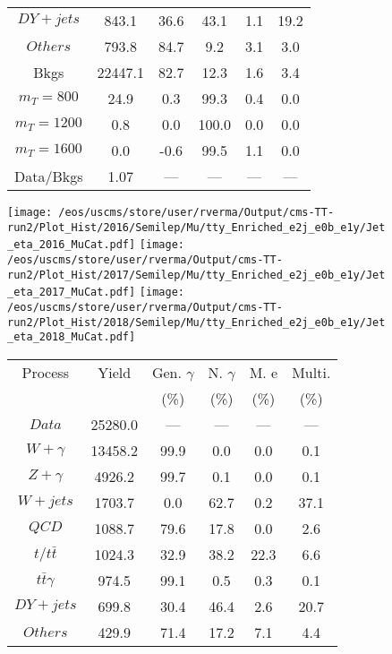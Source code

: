 \begin{figure}
\begin{minipage}[c]{0.32\textwidth}
{\begin{tabular}{cccccc}
$ DY+jets $ &  843.1 &  36.6 &  43.1 &  1.1 &  19.2\\
$ Others $ &  793.8 &  84.7 &  9.2 &  3.1 &  3.0\\
Bkgs &  22447.1 &  82.7 &  12.3 &  1.6 &  3.4\\
$ m_{T} = 800 $ &  24.9 &  0.3 &  99.3 &  0.4 &  0.0\\
$ m_{T} = 1200 $ &  0.8 &  0.0 &  100.0 &  0.0 &  0.0\\
$ m_{T} = 1600 $ &  0.0 &  -0.6 &  99.5 &  1.1 &  0.0\\
Data/Bkgs &  1.07 &  --- &  --- &  --- &  ---\\
\hline
\end{tabular}
}
\end{minipage}
\end{figure}

\begin{figure}
\centering
\texttt{[image: /eos/uscms/store/user/rverma/Output/cms-TT-run2/Plot\_Hist/2016/Semilep/Mu/tty\_Enriched\_e2j\_e0b\_e1y/Jet\_eta\_2016\_MuCat.pdf]}
\texttt{[image: /eos/uscms/store/user/rverma/Output/cms-TT-run2/Plot\_Hist/2017/Semilep/Mu/tty\_Enriched\_e2j\_e0b\_e1y/Jet\_eta\_2017\_MuCat.pdf]}
\texttt{[image: /eos/uscms/store/user/rverma/Output/cms-TT-run2/Plot\_Hist/2018/Semilep/Mu/tty\_Enriched\_e2j\_e0b\_e1y/Jet\_eta\_2018\_MuCat.pdf]}
\begin{minipage}[c]{0.32\textwidth}
\centering
\tiny{
\begin{tabular}{cccccc}
\hline
Process & Yield & Gen. $\gamma$ & N. $\gamma$ & M. e & Multi. \\
 &  & (\%) & (\%) & (\%) & (\%)  \\
\hline
                                                                      $ Data $ &  25280.0 &  --- &  --- &  --- &  ---\\
$ W+\gamma $ &  13458.2 &  99.9 &  0.0 &  0.0 &  0.1\\
$ Z+\gamma $ &  4926.2 &  99.7 &  0.1 &  0.0 &  0.1\\
$ W+jets $ &  1703.7 &  0.0 &  62.7 &  0.2 &  37.1\\
$ QCD $ &  1088.7 &  79.6 &  17.8 &  0.0 &  2.6\\
$ t/t\bar{t} $ &  1024.3 &  32.9 &  38.2 &  22.3 &  6.6\\
$ t\bar{t}\gamma $ &  974.5 &  99.1 &  0.5 &  0.3 &  0.1\\
$ DY+jets $ &  699.8 &  30.4 &  46.4 &  2.6 &  20.7\\
$ Others $ &  429.9 &  71.4 &  17.2 &  7.1 &  4.4\\

\end{tabular}}
\end{minipage}
\end{figure}
